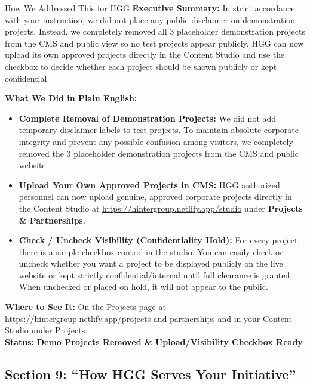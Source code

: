 \documentclass[11pt,a4paper]{article}
\begin{document}
\begin{DetailedResolutionBox}{How We Addressed This for HGG}
\textbf{Executive Summary:} In strict accordance with your instruction, we did not place any public disclaimer on demonstration projects. Instead, we completely removed all 3 placeholder demonstration projects from the CMS and public view so no test projects appear publicly. HGG can now upload its own approved projects directly in the Content Studio and use the checkbox to decide whether each project should be shown publicly or kept confidential.

\textbf{What We Did in Plain English:}
\begin{itemize}
    \item \textbf{Complete Removal of Demonstration Projects:} We did not add temporary disclaimer labels to test projects. To maintain absolute corporate integrity and prevent any possible confusion among visitors, we completely removed the 3 placeholder demonstration projects from the CMS and public website.
    \item \textbf{Upload Your Own Approved Projects in CMS:} HGG authorized personnel can now upload genuine, approved corporate projects directly in the Content Studio at \url{https://hintergroup.netlify.app/studio} under \textbf{Projects \& Partnerships}.
    \item \textbf{Check / Uncheck Visibility (Confidentiality Hold):} For every project, there is a simple checkbox control in the studio. You can easily check or uncheck whether you want a project to be displayed publicly on the live website or kept strictly confidential/internal until full clearance is granted. When unchecked or placed on hold, it will not appear to the public.
\end{itemize}

\textbf{Where to See It:} On the Projects page at \url{https://hintergroup.netlify.app/projects-and-partnerships} and in your Content Studio under Projects. \\
\textbf{Status:} \textcolor{HGGGreen}{\textbf{Demo Projects Removed \& Upload/Visibility Checkbox Ready}}
\end{DetailedResolutionBox}

\vspace{0.3cm}

\subsection{Section 9: ``How HGG Serves Your Initiative''}
\end{document}
